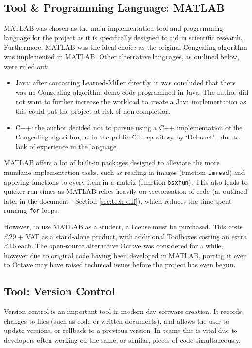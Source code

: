 \subsection{Tool \& Programming Language: MATLAB}
\label{ssec:matlab}

MATLAB \cite{MATLAB:2016} was chosen as the main implementation tool and programming language for the project as it is specifically designed to aid in scientific research. Furthermore, MATLAB was the ideal choice as the original \Gls{Congealing} algorithm was implemented in MATLAB. Other alternative languages, as outlined below, were ruled out:

\begin{itemize}
  \item Java: after contacting Learned-Miller directly, it was concluded that there was no \Gls{Congealing} algorithm demo code programmed in Java. The author did not want to further increase the workload to create a Java implementation as this could put the project at risk of non-completion.
  \item C++: the author decided not to pursue using a C++ implementation of the \Gls{Congealing} algorithm, as in the public Git repository by `Debonet' \cite{cpp_congealing}, due to lack of experience in the language.
\end{itemize}

MATLAB offers a lot of built-in packages designed to alleviate the more mundane implementation tasks, such as reading in images (function \texttt{imread}) and applying functions to every item in a matrix (function \texttt{bsxfun}). This also leads to quicker run-times as MATLAB relies heavily on vectorisation of code (as outlined later in the document - Section \ref{sec:tech-diff}), which reduces the time spent running \texttt{for} loops.

However, to use MATLAB as a student, a license must be purchased. This costs \pounds29 + VAT as a stand-alone product, with additional Toolboxes costing an extra \pounds16 each. The open-source alternative Octave \cite{octave} was considered for a while, however due to original code having been developed in MATLAB, porting it over to Octave may have raised technical issues before the project has even begun.

\subsection{Tool: Version Control}

Version control is an important tool in modern day software creation. It records changes to files (such as code or written documents), and allows the user to update versions, or rollback to a previous version. In teams this is vital due to developers often working on the same, or similar, pieces of code simultaneously.

